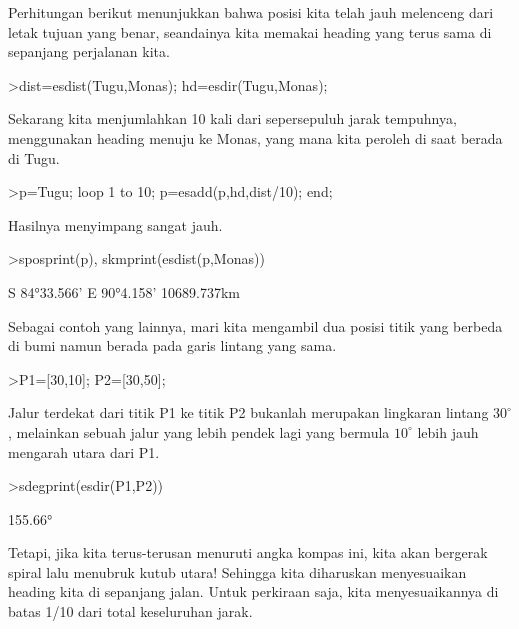 \documentclass[a4paper,11pt,oneside,enabledeprecatedfontcommands]{scrbook}
\newenvironment{eulernotebook}{}{}
\newenvironment{eulercomment}{\par\medskip\noindent}{\par\medskip}
\begin{document}
\begin{eulernotebook}
\begin{eulercomment}
Perhitungan berikut menunjukkan bahwa posisi kita telah jauh melenceng dari
letak tujuan yang benar, seandainya kita memakai heading yang terus sama di sepanjang perjalanan kita.
\end{eulercomment}
\begin{eulerprompt}
>dist=esdist(Tugu,Monas); hd=esdir(Tugu,Monas);
\end{eulerprompt}
\begin{eulercomment}
Sekarang kita menjumlahkan 10 kali dari sepersepuluh jarak tempuhnya, menggunakan heading menuju ke Monas, yang mana kita peroleh di saat berada di Tugu.
\end{eulercomment}
\begin{eulerprompt}
>p=Tugu; loop 1 to 10; p=esadd(p,hd,dist/10); end;
\end{eulerprompt}
\begin{eulercomment}
Hasilnya menyimpang sangat jauh.
\end{eulercomment}
\begin{eulerprompt}
>sposprint(p), skmprint(esdist(p,Monas))
\end{eulerprompt}
\begin{euleroutput}
S 84°33.566' E 90°4.158'
10689.737km
\end{euleroutput}
\begin{eulercomment}
Sebagai contoh yang lainnya, mari kita mengambil dua posisi titik yang berbeda
di bumi namun berada pada garis lintang yang sama.
\end{eulercomment}
\begin{eulerprompt}
>P1=[30,10]; P2=[30,50];
\end{eulercomment}
\begin{eulercomment}
Jalur terdekat dari titik P1 ke titik P2 bukanlah merupakan lingkaran lintang $30^\circ$,
melainkan sebuah jalur yang lebih pendek lagi yang bermula $10^\circ$ lebih jauh mengarah utara dari P1.
\end{eulercomment}
\begin{eulerprompt}
>sdegprint(esdir(P1,P2))
\end{eulerprompt}
\begin{euleroutput}
155.66°
\end{euleroutput}
\begin{eulercomment}
Tetapi, jika kita terus-terusan menuruti angka kompas ini, kita akan bergerak spiral
lalu menubruk kutub utara! Sehingga kita diharuskan menyesuaikan heading kita di sepanjang
jalan. Untuk perkiraan saja, kita menyesuaikannya di batas 1/10 dari total keseluruhan jarak.

\end{eulercomment}
\end{eulerprompt}
\end{eulernotebook}
\end{document}
